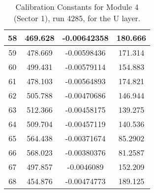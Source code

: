 \begin{table}[h]
{\begin{tabular}{|c|c|c|c|}
58	&	469.628	&	-0.00642358	&	180.666	\\	\hline
59	&	478.669	&	-0.00598436	&	171.314	\\	\hline
60	&	499.431	&	-0.00579114	&	154.883	\\	\hline
61	&	478.103	&	-0.00564893	&	174.821	\\	\hline
62	&	505.788	&	-0.00470686	&	146.944	\\	\hline
63	&	512.366	&	-0.00458175	&	139.275	\\	\hline
64	&	509.704	&	-0.00457119	&	140.536	\\	\hline
65	&	564.438	&	-0.00371674	&	85.2902	\\	\hline
66	&	568.023	&	-0.00380376	&	81.2587	\\	\hline
67	&	497.857	&	-0.0046089	&	152.209	\\	\hline
68	&	454.876	&	-0.00474773	&	189.125	\\	\hline
            \end{tabular}
        }
        \caption{Calibration Constants for Module 4 (Sector 1), run 4285, for the U layer.}
\end{table}


